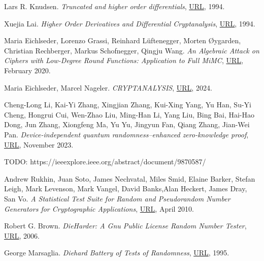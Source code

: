 \documentclass{Resources/UoBLab1}
\theoremstyle{definition}
\begin{document}
\begin{thebibliography}{10}
 Lars R. Knudsen. \textit{Truncated and higher order differentials}, \href{https://link.springer.com/chapter/10.1007/3-540-60590-8_16}{URL}, 1994.

 Xuejia Lai. \textit{Higher Order Derivatives and Differential Cryptanalysis}, \href{https://link.springer.com/chapter/10.1007/978-1-4615-2694-0_23}{URL}, 1994.

 Maria Eichlseder, Lorenzo Grassi, Reinhard Lüftenegger, Morten Øygarden, Christian Rechberger, Markus Schofnegger, Qingju Wang. \textit{An Algebraic Attack on Ciphers with Low-Degree Round Functions: Application to Full MiMC}, \href{https://eprint.iacr.org/2020/182.pdf}{URL}, February 2020.

 Maria Eichlseder, Marcel Nageler. \textit{CRYPTANALYSIS}, \href{https://www.iaik.tugraz.at/course/cryptanalysis-705068-sommersemester-2024}{URL}, 2024.

 Cheng-Long Li, Kai-Yi Zhang, Xingjian Zhang, Kui-Xing Yang, Yu Han, Su-Yi Cheng, Hongrui Cui, Wen-Zhao Liu, Ming-Han Li, Yang Liu, Bing Bai, Hai-Hao Dong, Jun Zhang, Xiongfeng Ma, Yu Yu, Jingyun Fan, Qiang Zhang, Jian-Wei Pan. \textit{Device-independent quantum randomness–enhanced zero-knowledge proof}, \href{https://doi.org/10.1073/pnas.2205463120}{URL}, November 2023.

 TODO: https://ieeexplore.ieee.org/abstract/document/9870587/

 Andrew Rukhin, Juan Soto, James Nechvatal, Miles Smid, Elaine Barker, Stefan Leigh, Mark Levenson, Mark Vangel, David Banks,Alan Heckert, James Dray, San Vo. \textit{A Statistical Test Suite for Random and Pseudorandom Number Generators for Cryptographic Applications}, \href{https://csrc.nist.gov/pubs/sp/800/22/r1/upd1/final}{URL}, April 2010.

 Robert G. Brown. \textit{DieHarder: A Gnu Public License Random Number Tester}, \href{https://rurban.github.io/dieharder/manual/dieharder.pdf}{URL}, 2006.

 George Marsaglia. \textit{Diehard Battery of Tests of Randomness}, \href{https://web.archive.org/web/20160125103112/http://stat.fsu.edu/pub/diehard/}{URL}, 1995.

\end{thebibliography}
\end{document}
